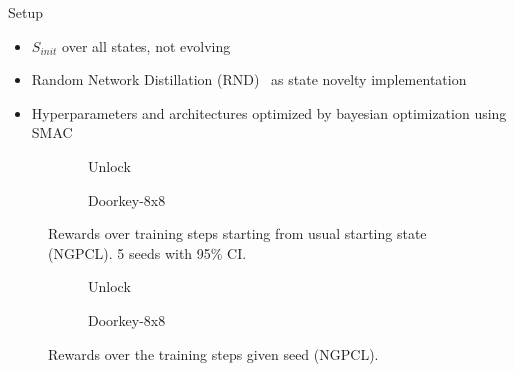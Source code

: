 \documentclass[aspectratio=169]{beamer}
\begin{document}
\begin{frame}{Setup}
  \begin{itemize}
    \item $S_{init}$ over all states, not evolving
    \item Random Network Distillation (RND)~\parencite{rnd} as state novelty implementation
    \item Hyperparameters and architectures optimized by bayesian optimization using SMAC~\parencite{smac}
  \end{itemize}
\end{frame}

\begin{frame}
  \begin{figure}
    \begin{subfigure}{0.48\textwidth}
      \centering
      
      \caption{Unlock}
    \end{subfigure}
    \begin{subfigure}{0.48\textwidth}
      \centering
      
      \caption{Doorkey-8x8}
    \end{subfigure}
    \caption{Rewards over training steps starting from usual starting state (NGPCL). 5 seeds with 95\% CI.}
  \end{figure}
\end{frame}

\begin{frame}
  \begin{figure}
    \begin{subfigure}{0.48\textwidth}
      \centering
      
      \caption{Unlock}
    \end{subfigure}
    \begin{subfigure}{0.48\textwidth}
      \centering
      
      \caption{Doorkey-8x8}
    \end{subfigure}
    \caption{Rewards over the training steps given seed (NGPCL).}
  \end{figure}
\end{frame}
\end{document}
